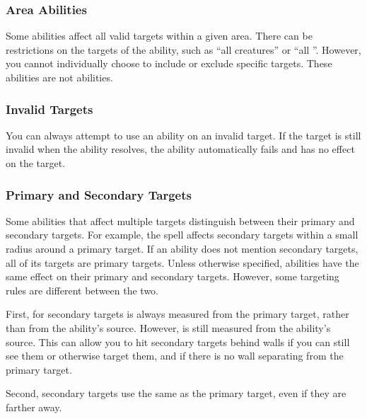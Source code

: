         \subsubsection{Area Abilities}
            Some abilities affect all valid targets within a given area.
            There can be restrictions on the targets of the ability, such as ``all creatures'' or ``all ''.
            However, you cannot individually choose to include or exclude specific targets.
            These abilities are not  abilities.

        \subsubsection{Invalid Targets}
            You can always attempt to use an ability on an invalid target.
            If the target is still invalid when the ability resolves, the ability automatically fails and has no effect on the target.

        \subsubsection{Primary and Secondary Targets}\label{Primary and Secondary Targets}
            Some abilities that affect multiple targets distinguish between their primary and secondary targets.
            For example, the  spell affects secondary targets within a small radius around a primary target.
            If an ability does not mention secondary targets, all of its targets are primary targets.
            Unless otherwise specified, abilities have the same effect on their primary and secondary targets.
            However, some targeting rules are different between the two.

            First,  for secondary targets is always measured from the primary target, rather than from the ability's source.
            However,  is still measured from the ability's source.
            This can allow you to hit secondary targets behind walls if you can still see them or otherwise target them, and if there is no wall separating from the primary target.

            Second, secondary targets use the same  as the primary target, even if they are farther away.
            
